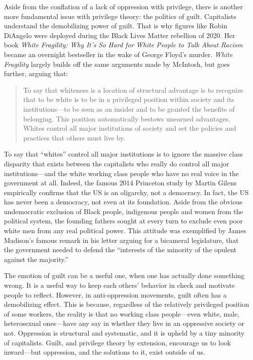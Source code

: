Aside from the conflation of a lack of oppression with privilege, there is another more fundamental issue with privilege theory: the politics of guilt. Capitalists understand the demobilizing power of guilt. That is why figures like Robin DiAngelo were deployed during the Black Lives Matter rebellion of 2020. Her book \emph{White Fragility: Why It's So Hard for White People to Talk About Racism} became an overnight bestseller in the wake of George Floyd's murder. \emph{White Fragility} largely builds off the same arguments made by McIntosh, but goes further, arguing that:

\blockquote{To say that whiteness is a location of structural advantage is to recognize that to be white is to be in a privileged position within society and its institutions---to be seen as an insider and to be granted the benefits of belonging. This position automatically bestows unearned advantages. Whites control all major institutions of society and set the policies and practices that others must live by.}

To say that ``whites'' control all major institutions is to ignore the massive class disparity that exists between the capitalists who really do control all major institutions---and the white working class people who have no real voice in the government at all. Indeed, the famous 2014 Princeton study by Martin Gilens empirically confirms that the US is an oligarchy, not a democracy. In fact, the US has never been a democracy, not even at its foundation. Aside from the obvious undemocratic exclusion of Black people, indigenous people and women from the political system, the founding fathers sought at every turn to exclude even poor white men from any real political power. This attitude was exemplified by James Madison's famous remark in his letter arguing for a bicameral legislature, that the government needed to defend the ``interests of the minority of the opulent against the majority.''

The emotion of guilt can be a useful one, when one has actually done something wrong. It is a useful way to keep each others' behavior in check and motivate people to reflect. However, in anti-oppression movements, guilt often has a demobilizing effect. This is because, regardless of the relatively privileged position of some workers, the reality is that no working class people---even white, male, heterosexual ones---have any say in whether they live in an oppressive society or not. Oppression is structural and systematic, and it is upheld by a tiny minority of capitalists. Guilt, and privilege theory by extension, encourage us to look inward---but oppression, and the solutions to it, exist outside of us.

